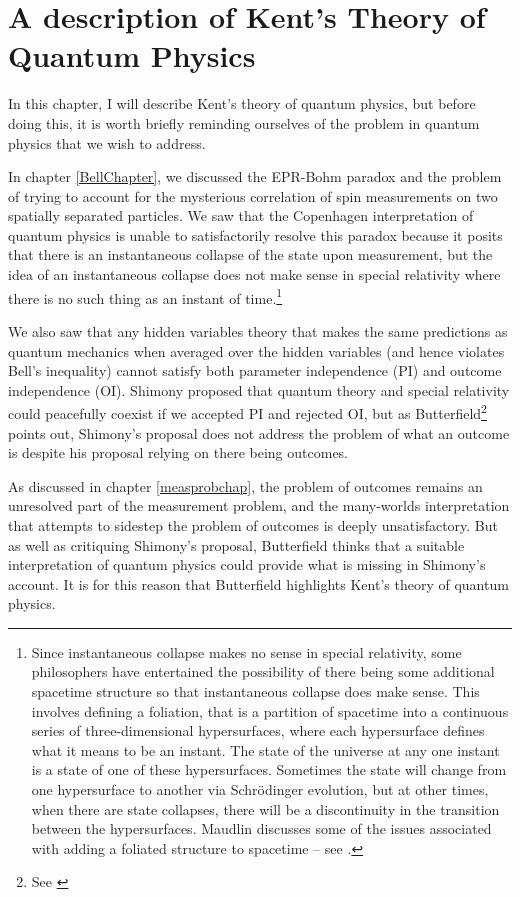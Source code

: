 \chapter{A description of Kent's Theory of Quantum Physics\label{kentchapterdesc}}

In this chapter, I will describe Kent's theory of quantum physics, but before doing this, it is worth briefly reminding ourselves of the problem in quantum physics that we wish to address. 

In chapter \ref{BellChapter}, we discussed the EPR-Bohm paradox and the problem of trying to account for the mysterious correlation of spin measurements on two spatially separated particles. We saw that the Copenhagen interpretation of quantum physics is unable to satisfactorily resolve this paradox because it posits that there is an instantaneous collapse of the state upon measurement, but the idea of an instantaneous collapse does not make sense in special relativity where there is no such thing as an instant of time.\footnote{Since instantaneous collapse makes no sense in special relativity, some philosophers have entertained the possibility of there being some additional spacetime structure so that instantaneous collapse does make sense. This involves defining a foliation, that is a partition of spacetime into a continuous series of three-dimensional hypersurfaces, where each hypersurface defines what it means to be an instant. The state of the universe at any one instant is a state of one of these hypersurfaces. Sometimes the state will change from one hypersurface to another via Schr\"{o}dinger evolution, but at other times, when there are state collapses, there will be a discontinuity in the transition between the hypersurfaces. Maudlin discusses some of the issues associated with adding a foliated structure to spacetime -- see \cite{Maudlin3}.} 

We also saw that any hidden variables theory that makes the same predictions as quantum mechanics when averaged over the hidden variables (and hence violates Bell's inequality) cannot satisfy both  parameter independence (PI) and outcome independence (OI). Shimony proposed that quantum theory and special relativity could peacefully coexist if we accepted PI and rejected OI, but as Butterfield\footnote{See \cite{Butterfield}} points out, Shimony's proposal  does not address the problem of what an outcome is despite his proposal relying on there being outcomes. 

As discussed in chapter \ref{measprobchap}, the problem of outcomes remains an unresolved part of the measurement problem, and the many-worlds interpretation that attempts to sidestep the problem of outcomes is deeply unsatisfactory. But as well as critiquing Shimony's proposal, Butterfield thinks that a suitable interpretation of quantum physics could provide what is missing in Shimony's account. It is for this reason that Butterfield highlights Kent's theory of quantum physics.

